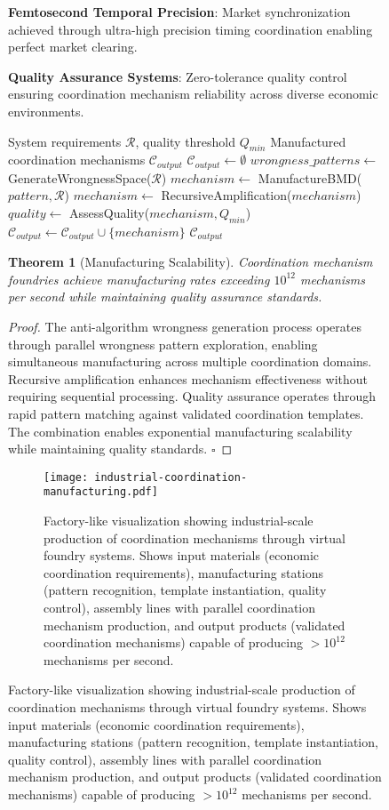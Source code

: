 \documentclass[12pt,a4paper]{article}
\newtheorem{theorem}{Theorem}
\begin{document}
\begin{figure}[H]
\textbf{Femtosecond Temporal Precision}: Market synchronization achieved through ultra-high precision timing coordination enabling perfect market clearing.

\textbf{Quality Assurance Systems}: Zero-tolerance quality control ensuring coordination mechanism reliability across diverse economic environments.

\begin{algorithm}
\caption{Industrial BMD Coordination Manufacturing}
\begin{algorithmic}[1]
\Require System requirements $\mathcal{R}$, quality threshold $Q_{min}$
\Ensure Manufactured coordination mechanisms $\mathcal{C}_{output}$
\State $\mathcal{C}_{output} \leftarrow \emptyset$
\State $wrongness\_patterns \leftarrow$ GenerateWrongnessSpace($\mathcal{R}$)
    \State $mechanism \leftarrow$ ManufactureBMD($pattern, \mathcal{R}$)
    \State $mechanism \leftarrow$ RecursiveAmplification($mechanism$)
    \State $quality \leftarrow$ AssessQuality($mechanism, Q_{min}$)
        \State $\mathcal{C}_{output} \leftarrow \mathcal{C}_{output} \cup \{mechanism\}$
    \EndIf
\EndFor
\Return $\mathcal{C}_{output}$
\end{algorithmic}
\end{algorithm}

\begin{theorem}[Manufacturing Scalability]
Coordination mechanism foundries achieve manufacturing rates exceeding $10^{12}$ mechanisms per second while maintaining quality assurance standards.
\end{theorem}

\begin{proof}
The anti-algorithm wrongness generation process operates through parallel wrongness pattern exploration, enabling simultaneous manufacturing across multiple coordination domains. Recursive amplification enhances mechanism effectiveness without requiring sequential processing. Quality assurance operates through rapid pattern matching against validated coordination templates. The combination enables exponential manufacturing scalability while maintaining quality standards. $\square$
\end{proof}

\begin{figure}[H]
\centering
\texttt{[image: industrial-coordination-manufacturing.pdf]}
\caption{Factory-like visualization showing industrial-scale production of coordination mechanisms through virtual foundry systems. Shows input materials (economic coordination requirements), manufacturing stations (pattern recognition, template instantiation, quality control), assembly lines with parallel coordination mechanism production, and output products (validated coordination mechanisms) capable of producing $>10^{12}$ mechanisms per second.}
\label{fig:industrial_manufacturing}
\end{figure}


\end{figure}
\end{document}
